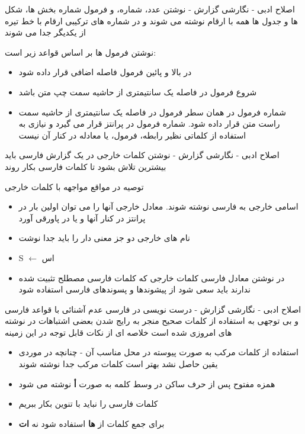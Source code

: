 \documentclass[14pt]{beamer}
\makeatletter
\newcommand{\rtlist}{\raggedleft\rightskip\@totalleftmargin}
\newcommand{\framefontsizelarge}{\fontsize{18pt}{0pt}\selectfont}
\newcommand{\frametitlefontsize}{\fontsize{20pt}{0pt}\selectfont}
\makeatother
\begin{document}
\begin{persian}
	\begin{frame}[plain]{\frametitlefontsize اصلاح ادبی - نگارشی گزارش - نوشتن عدد، شماره، و فرمول}
		\framefontsizelarge
		شماره بخش ها، شکل ها و جدول ها همه با ارقام نوشته می شوند و در شماره های ترکیبی ارقام با خط تیره از یکدیگر جدا می شوند
		
		نوشتن فرمول ها بر اساس قواعد زیر است:
		\begin{itemize}\rtlist
			\item در بالا و پائین فرمول فاصله اضافی قرار داده شود
			\item شروع فرمول در فاصله یک سانتیمتری از حاشیه سمت چپ متن باشد
			\item شماره فرمول در همان سطر فرمول در فاصله یک سانتیمتری از حاشیه سمت راست متن قرار داده شود. شماره فرمول در پرانتز قرار می گیرد و نیازی به استفاده از کلماتی نظیر رابطه، فرمول، یا معادله در کنار آن نیست
		\end{itemize}
	\end{frame}	
	
	\begin{frame}[plain]{\frametitlefontsize اصلاح ادبی - نگارشی گزارش - نوشتن کلمات خارجی}
		\framefontsizelarge
		در یک گزارش فارسی باید بیشترین تلاش بشود تا کلمات فارسی بکار روند
		
		توصیه در مواقع مواجهه با کلمات خارجی
		\begin{itemize}\rtlist
			\item اسامی خارجی به فارسی نوشته شوند. معادل خارجی آنها را می توان اولین بار در پرانتز در کنار آنها و یا در پاورقی آورد
			\item نام های خارجی دو جز معنی دار را باید جدا نوشت
			\item S $\leftarrow$ اس
			\item در نوشتن معادل فارسی کلمات خارجی که کلمات فارسی مصطلح تثبیت شده ندارند باید سعی شود از پیشوندها و پسوندهای فارسی استفاده شود
		\end{itemize}
	\end{frame}	

	\begin{frame}[plain]{\frametitlefontsize اصلاح ادبی - نگارشی گزارش - درست نویسی در فارسی}
		\framefontsizelarge
		عدم آشنائی با قواعد فارسی و بی توجهی به استفاده از کلمات صحیح منجر به رایج شدن بعضی اشتباهات در نوشته های امروزی شده است
		خلاصه ای از نکات قابل توجه در این زمینه
		\begin{itemize}\rtlist
			\item استفاده از کلمات مرکب به صورت پیوسته در محل مناسب آن - چنانچه در موردی یقین حاصل نشد بهتر است کلمات مرکب جدا نوشته شوند
			\item همزه مفتوح پس از حرف ساکن در وسط کلمه به صورت \textbf{أ} نوشته می شود
			\item کلمات فارسی را نباید با تنوین بکار ببریم
			\item برای جمع کلمات از \textbf{ها} استفاده شود نه \textbf{ات}
		\end{itemize}
	\end{frame}	
	

\end{persian}
\end{document}
